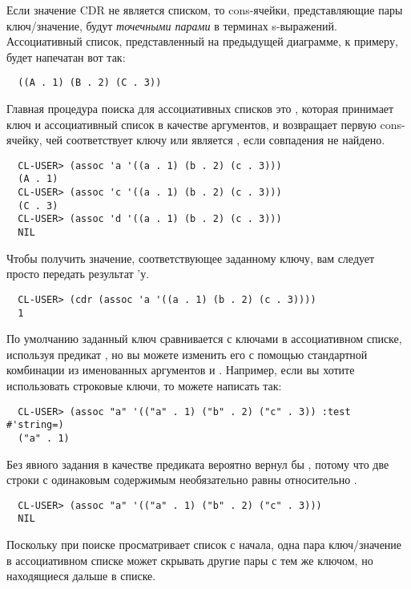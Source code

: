 Если значение CDR не является списком, то cons-ячейки, представляющие пары ключ/значение,
будут \textit{точечными парами} в терминах s-выражений. Ассоциативный список,
представленный на предыдущей диаграмме, к примеру, будет напечатан вот так:

\begin{verbatim}
  ((A . 1) (B . 2) (C . 3))
\end{verbatim}

Главная процедура поиска для ассоциативных списков это , которая принимает
ключ и ассоциативный список в качестве аргументов, и возвращает первую cons-ячейку, чей
 соответствует ключу или является , если совпадения не найдено.
  
\begin{verbatim}
  CL-USER> (assoc 'a '((a . 1) (b . 2) (c . 3)))
  (A . 1)
  CL-USER> (assoc 'c '((a . 1) (b . 2) (c . 3)))
  (C . 3)
  CL-USER> (assoc 'd '((a . 1) (b . 2) (c . 3)))
  NIL
\end{verbatim}

Чтобы получить значение, соответствующее заданному ключу, вам следует просто передать
результат  'у.
  
\begin{verbatim}
  CL-USER> (cdr (assoc 'a '((a . 1) (b . 2) (c . 3))))
  1
\end{verbatim}

По умолчанию заданный ключ сравнивается с ключами в ассоциативном списке, используя
предикат , но вы можете изменить его с помощью стандартной комбинации из
именованных аргументов  и . Например, если вы хотите использовать
строковые ключи, то можете написать так:
  
\begin{verbatim}
  CL-USER> (assoc "a" '(("a" . 1) ("b" . 2) ("c" . 3)) :test #'string=)
  ("a" . 1)
\end{verbatim}

Без явного задания в качестве  предиката   вероятно
вернул бы , потому что две строки с одинаковым содержимым необязательно равны
относительно .

\begin{verbatim}
  CL-USER> (assoc "a" '(("a" . 1) ("b" . 2) ("c" . 3)))
  NIL
\end{verbatim}

Поскольку при поиске  просматривает список с начала, одна пара ключ/значение в
ассоциативном списке может скрывать другие пары с тем же ключом, но находящиеся дальше в
списке.


